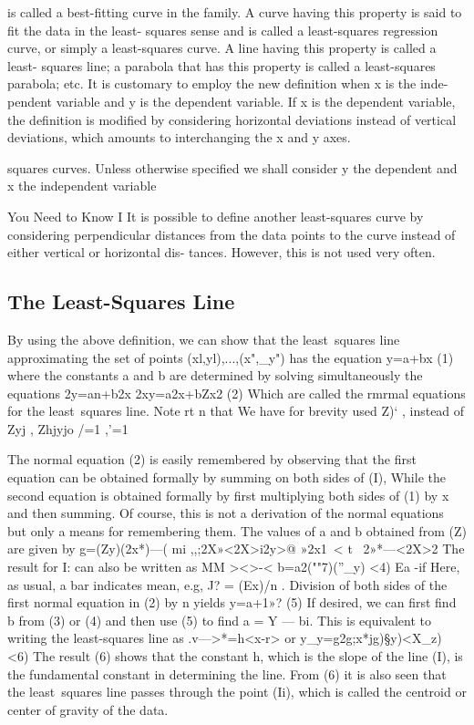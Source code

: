 is called a best-ﬁtting curve in the family.
A curve having this property is said to ﬁt the data in the least-
squares sense and is called a least-squares regression curve, or simply
a least-squares curve. A line having this property is called a least-
squares line; a parabola that has this property is called a least-squares
parabola; etc.
It is customary to employ the new deﬁnition when x is the inde-
pendent variable and y is the dependent variable. If x is the dependent
variable, the deﬁnition is modiﬁed by considering horizontal deviations
instead of vertical deviations, which amounts to interchanging the x and 
y axes. 

squares curves. Unless otherwise speciﬁed we shall consider y the
dependent and x the independent variable

You Need to Know I
It is possible to define another least-squares curve by
considering perpendicular distances from the data points
to the curve instead of either vertical or horizontal dis-
tances. However, this is not used very often.
\subsection{The Least-Squares Line}
By using the above deﬁnition, we can show that the least~squares line
approximating the set of points (xl,yl),...,(x",_y") has the equation
y=a+bx (1)
where the constants a and b are determined by solving simultaneously
the equations
2y=an+b2x
2xy=a2x+bZx2 (2)
Which are called the rmrmal equations for the least~squares line. Note
rt n
that We have for brevity used Z)‘ ,  instead of Zyj , Zhjyjo
/=1 ,'=1

The normal equation (2) is easily remembered by observing that the
ﬁrst equation can be obtained formally by summing on both sides of (I),
While the second equation is obtained formally by ﬁrst multiplying both
sides of (1) by x and then summing. Of course, this is not a derivation
of the normal equations but only a means for remembering them.
The values of a and b obtained from (Z) are given by
g=(Zy)(2x*)—( mi ,,;2X»<2X>i2y>@
»2x1~< t ~2»*—<2X>2
The result for I: can also be written as
MM
><>-<
b=a2(""7)(”_y) <4)
Ea -if
Here, as usual, a bar indicates mean, e.g, J? = (Ex)/n . Division
of both sides of the ﬁrst normal equation in (2) by n yields
y=a+1»? (5)
If desired, we can ﬁrst ﬁnd b from (3) or (4) and then use (5) to ﬁnd
a = Y — bi. This is equivalent to writing the least-squares line as
.v—>*=h<x-r> or y_y=g2g;x*jg)§y)<X_z) <6)
The result (6) shows that the constant h, which is the slope of the
line (I), is the fundamental constant in determining the line. From (6) it
is also seen that the least~squares line passes through the point (Ii),
which is called the centroid or center of gravity of the data.

